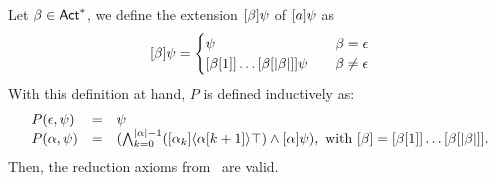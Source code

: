 \begin{proposition}\label{pro:srefaxioms}
Let $\beta \in {\rm \sf Act}^*$, we define the extension $[\beta]\psi$ of $[a]\psi$ as
\[
\mlbox{\beta} \psi = 
\begin{cases}
\psi &\quad \beta = \epsilon\\
\mlbox{\beta[1]} \dots \mlbox{\beta[\card{\beta}]} \psi &\quad \beta \neq \epsilon \\
\end{cases}
\]
With this definition at hand, $P$ is defined inductively as: 
\[
    \begin{array}{lcl}
        P(\epsilon,\psi) & = & \psi \\
        P(\alpha,\psi)  &= &(\bigwedge_{k=0}^{|{\alpha}|-1}([\alpha_k]\langle \alpha[k+1] \rangle\top) \wedge [\alpha] \psi), \mbox{ with } [\beta] = [\beta[1]] \dots [\beta[|{\beta}|]]. 
    \end{array}
\]
Then, the reduction axioms from~ are valid.
\end{proposition}
